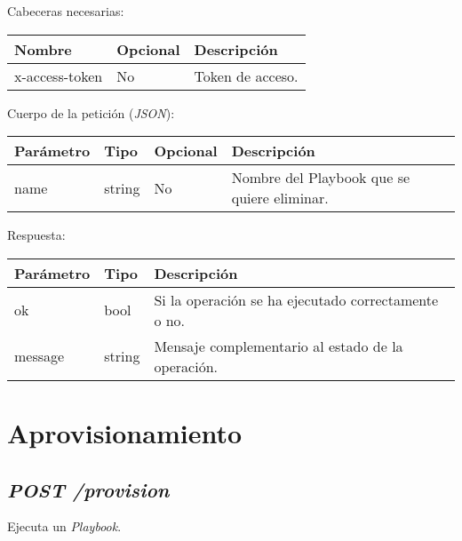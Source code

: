 		Cabeceras necesarias:
		\begin{table}[h!]
			\centering
	\begin{adjustbox}{max width=\textwidth}
			\begin{tabular}{|l|l|l|}
				\hline
				Nombre & Opcional & Descripción \\ \hline
				x-access-token & No & Token de acceso. \\ \hline
			\end{tabular}
\end{adjustbox}
		\end{table}
		
		\pagebreak
		Cuerpo de la petición (\textit{JSON}):
		\begin{table}[h!]
			\centering
	\begin{adjustbox}{max width=\textwidth}
			\begin{tabular}{|l|l|l|l|}
				\hline
				Parámetro & Tipo & Opcional & Descripción \\ \hline
				name & string & No & Nombre del Playbook que se quiere eliminar. \\ \hline
			\end{tabular}
\end{adjustbox}
		\end{table}
		
		Respuesta:
		\begin{table}[h!]
			\centering
	\begin{adjustbox}{max width=\textwidth}
			\begin{tabular}{|l|l|l|}
				\hline
				Parámetro & Tipo & Descripción \\ \hline
				ok & bool & Si la operación se ha ejecutado correctamente o no. \\ \hline
				message & string & Mensaje complementario al estado de la operación. \\ \hline
			\end{tabular}
\end{adjustbox}
		\end{table}











\section{Aprovisionamiento}


	\subsection{\textit{POST /provision}}
		Ejecuta un \textit{Playbook}.
	
